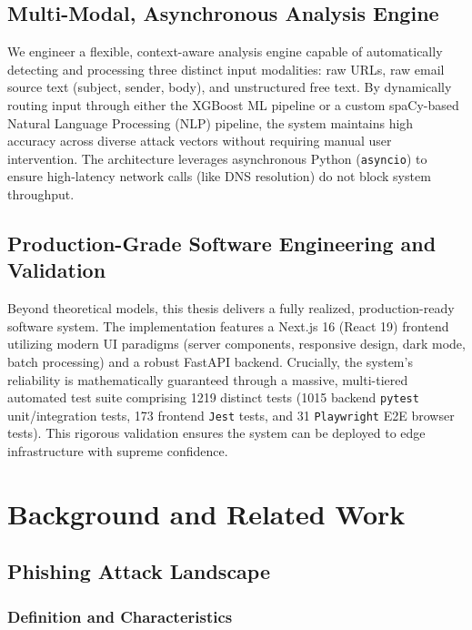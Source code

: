 \subsection{Multi-Modal, Asynchronous Analysis
Engine}\label{multi-modal-asynchronous-analysis-engine}

We engineer a flexible, context-aware analysis engine capable of
automatically detecting and processing three distinct input modalities:
raw URLs, raw email source text (subject, sender, body), and
unstructured free text. By dynamically routing input through either the
XGBoost ML pipeline or a custom spaCy-based Natural Language Processing
(NLP) pipeline, the system maintains high accuracy across diverse attack
vectors without requiring manual user intervention. The architecture
leverages asynchronous Python (\texttt{asyncio}) to ensure high-latency
network calls (like DNS resolution) do not block system throughput.

\subsection{Production-Grade Software Engineering and
Validation}\label{production-grade-software-engineering-and-validation}

Beyond theoretical models, this thesis delivers a fully realized,
production-ready software system. The implementation features a Next.js
16 (React 19) frontend utilizing modern UI paradigms (server components,
responsive design, dark mode, batch processing) and a robust FastAPI
backend. Crucially, the system's reliability is mathematically
guaranteed through a massive, multi-tiered automated test suite
comprising 1219 distinct tests (1015 backend \texttt{pytest}
unit/integration tests, 173 frontend \texttt{Jest} tests, and 31
\texttt{Playwright} E2E browser tests). This rigorous validation ensures
the system can be deployed to edge infrastructure with supreme
confidence.

\section{Background and Related Work}
\label{background-and-related-work}

\subsection{Phishing Attack Landscape}\label{phishing-attack-landscape}

\subsubsection{Definition and
Characteristics}\label{definition-and-characteristics}

